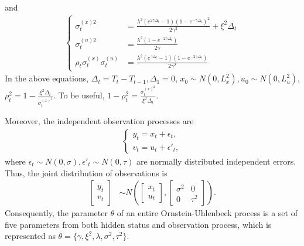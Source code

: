 and 
\begin{align*}
\begin{cases}
\sigma_t^{(x)2} &=\frac{\lambda^2 \left(e^{2 \gamma\Delta_t}-1\right) \left(1 -e^{-\gamma\Delta_t}\right)^2}{2 \gamma ^3 } + \xi^2\Delta_t\\
\sigma_t^{(u)2} &= \frac{\lambda ^2 \left(1- e^{-2 \gamma\Delta_t}\right)}{2 \gamma } \\
\rho_t\sigma_t^{(x)}\sigma_t^{(u)} & =\frac{\lambda ^2 \left(e^{\gamma\Delta_t} -1\right) \left(1-e^{-2\gamma\Delta_t}\right)}{2 \gamma ^2}
\end{cases}
\end{align*}
In the above equations, $\Delta_t = T_t-T_{t-1}, \Delta_1=0$, $x_0\sim N(0,L_x^2), u_0\sim N(0,L_u^2)$, $\rho_t^2 = 1-\frac{\xi^2 \Delta_t}{\sigma_t^{(x)^2}}$. To be useful, $1-\rho_t^2 =\frac{\sigma_t^{(x)^2}}{\xi^2 \Delta_t}$. 

Moreover, the independent observation processes are
\begin{align*}\begin{cases} y_t=x_t+\epsilon_t,\\ v_t=u_t+\epsilon'_t, \end{cases} \end{align*}
where $\epsilon_t\sim N(0,\sigma),\epsilon'_t\sim N(0,\tau)$ are normally distributed independent errors. Thus, the joint distribution of observations is 
\begin{align}\label{obmodel}
\begin{bmatrix} y_t \\ v_t \end{bmatrix} &\sim N\left(
\begin{bmatrix}x_t \\ u_t \end{bmatrix} , 
\begin{bmatrix}
\sigma^2 & 0\\
0 & \tau^2
\end{bmatrix} \right).
\end{align}
Consequently, the parameter $\theta$ of an entire Ornstein-Uhlenbeck process is a set of five parameters from both hidden status and observation process, which is represented as $\theta = \{\gamma,\xi^2,\lambda,\sigma^2,\tau^2 \}$. 


